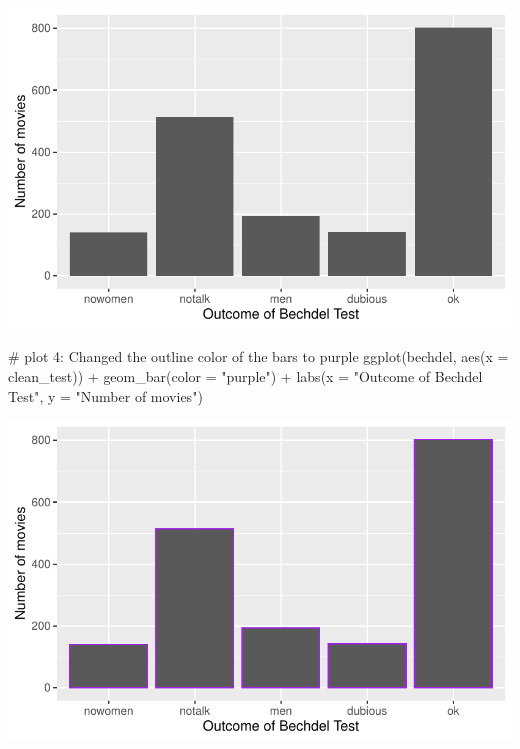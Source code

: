 \documentclass[
  letterpaper,
  DIV=11,
  numbers=noendperiod]{scrreprt}
\newenvironment{Shaded}{\begin{snugshade}}{\end{snugshade}}
\newcommand{\AttributeTok}[1]{\textcolor[rgb]{0.40,0.45,0.13}{#1}}
\newcommand{\CommentTok}[1]{\textcolor[rgb]{0.37,0.37,0.37}{#1}}
\newcommand{\FunctionTok}[1]{\textcolor[rgb]{0.28,0.35,0.67}{#1}}
\newcommand{\NormalTok}[1]{\textcolor[rgb]{0.00,0.23,0.31}{#1}}
\newcommand{\SpecialCharTok}[1]{\textcolor[rgb]{0.37,0.37,0.37}{#1}}
\newcommand{\StringTok}[1]{\textcolor[rgb]{0.13,0.47,0.30}{#1}}
\begin{document}
\includegraphics{src/02-Intro_Data_Viz_files/figure-pdf/unnamed-chunk-19-3.pdf}

\begin{Shaded}
\begin{Highlighting}[]

\CommentTok{\# plot 4: Changed the outline color of the bars to purple}
\FunctionTok{ggplot}\NormalTok{(bechdel, }\FunctionTok{aes}\NormalTok{(}\AttributeTok{x =}\NormalTok{ clean\_test)) }\SpecialCharTok{+}
\FunctionTok{geom\_bar}\NormalTok{(}\AttributeTok{color =} \StringTok{"purple"}\NormalTok{) }\SpecialCharTok{+}
\FunctionTok{labs}\NormalTok{(}\AttributeTok{x =} \StringTok{"Outcome of Bechdel Test"}\NormalTok{, }\AttributeTok{y =} \StringTok{"Number of movies"}\NormalTok{)}
\end{Highlighting}
\end{Shaded}

\includegraphics{src/02-Intro_Data_Viz_files/figure-pdf/unnamed-chunk-19-4.pdf}
\end{document}
